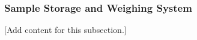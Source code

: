 
\subsubsection{Sample Storage and Weighing System}
\label{subsubsec:design_2_1_7_sample_storage_weighing_system}

[Add content for this subsection.]
